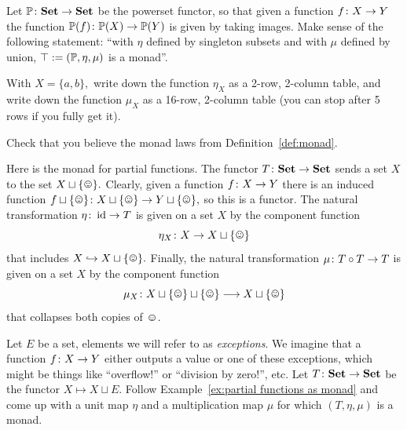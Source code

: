 \documentclass[../main/CT4S-EN-RU]{subfiles}
\begin{document}
\begin{exampleRUS}\label{ex:monad}
\end{exampleRUS}

\begin{exerciseENG}\label{exc:power set monad}
Let ${\mathbb P}\colon{\mathbf{Set}}\rightarrow{\mathbf{Set}}$ be the powerset functor, so that given a function $f\colon X\rightarrow Y$ the function ${\mathbb P}(f)\colon{\mathbb P}(X)\rightarrow{\mathbb P}(Y)$ is given by taking images.
\sexc Make sense of the following statement: “with $\eta$ defined by singleton subsets and with $\mu$ defined by union, $\top:=({\mathbb P},\eta,\mu)$ is a monad”.
\item  With $X=\{a,b\},$ write down the function $\eta_X$ as a 2-row, 2-column table, and write down the function $\mu_X$ as a 16-row, 2-column table (you can stop after 5 rows if you fully get it).
\item Check that you believe the monad laws from Definition~\ref{def:monad}.
\endsexc
\end{exerciseENG}

\begin{exerciseRUS}\label{exc:power set monad}
\end{exerciseRUS}

\begin{exampleENG}\label{ex:partial functions as monad}
Here is the monad for partial functions. The functor $T\colon{\mathbf{Set}}\rightarrow{\mathbf{Set}}$ sends a set $X$ to the set $X\sqcup\singleton.$ Clearly, given a function $f\colon X\rightarrow Y$ there is an induced function $f\sqcup\singleton\taking X\sqcup\singleton\to Y\sqcup\singleton,$ so this is a functor. The natural transformation $\eta\colon\operatorname{id}\rightarrow T$ is given on a set $X$ by the component function $$\eta_X\taking X\to X\sqcup\singleton$$ that includes $X\inj X\sqcup\singleton.$ Finally, the natural transformation $\mu\colon T\circ T\rightarrow T$ is given on a set $X$ by the component function $$\mu_X\taking X\sqcup\singleton\sqcup\singleton\too X\sqcup\singleton$$ that collapses both copies of $\smiley.$
\end{exampleENG}

\begin{exampleRUS}\label{ex:partial functions as monad}
\end{exampleRUS}

\begin{exerciseENG}\label{exc:exceptions}
Let $E$ be a set, elements we will refer to as {\em exceptions}. We imagine that a function $f\colon X\rightarrow Y$ either outputs a value or one of these exceptions, which might be things like “overflow!” or “division by zero!”, etc. Let $T\colon{\mathbf{Set}}\rightarrow{\mathbf{Set}}$ be the functor $X\mapsto X\sqcup E.$ Follow Example~\ref{ex:partial functions as monad} and come up with a unit map $\eta$ and a multiplication map $\mu$ for which $(T,\eta,\mu)$ is a monad.
\end{exerciseENG}
\end{document}
